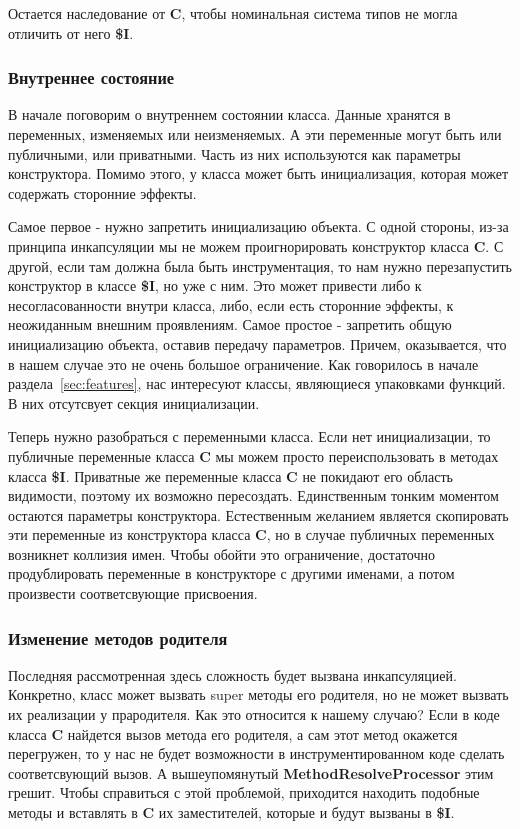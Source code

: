 Остается наследование от \textbf{C}, чтобы номинальная система типов не могла
отличить от него \textbf{\$I}.

\subsubsection{Внутреннее состояние}

В начале поговорим о внутреннем состоянии класса.
Данные хранятся в переменных, изменяемых или неизменяемых.
А эти переменные могут быть или публичными, или приватными.
Часть из них используются как параметры конструктора.
Помимо этого, у класса может быть инициализация, которая может содержать
сторонние эффекты.

Самое первое - нужно запретить инициализацию объекта.
С одной стороны, из-за принципа инкапсуляции мы не можем проигнорировать
конструктор класса \textbf{C}.
С другой, если там должна была быть инструментация, то нам нужно перезапустить
конструктор в классе \textbf{\$I}, но уже с ним.
Это может привести либо к несогласованности внутри класса, либо, если есть
сторонние эффекты, к неожиданным внешним проявлениям.
Самое простое - запретить общую инициализацию объекта, оставив передачу параметров.
Причем, оказывается, что в нашем случае это не очень большое ограничение.
Как говорилось в начале раздела~\ref{sec:features}, нас интересуют классы,
являющиеся упаковками функций.
В них отсутсвует секция инициализации.

Теперь нужно разобраться с переменными класса.
Если нет инициализации, то публичные переменные класса \textbf{C} мы можем
просто переиспользовать в методах класса \textbf{\$I}.
Приватные же переменные класса \textbf{C} не покидают его область
видимости, поэтому их возможно пересоздать.
Единственным тонким моментом остаются параметры конструктора.
Естественным желанием является скопировать эти переменные из конструктора
класса \textbf{C}, но в случае публичных переменных возникнет коллизия имен.
Чтобы обойти это ограничение, достаточно продублировать переменные в конструкторе
с другими именами, а потом произвести соответсвующие присвоения.

\subsubsection{Изменение методов родителя}

Последняя рассмотренная здесь сложность будет вызвана инкапсуляцией.
Конкретно, класс может вызвать super методы его родителя, но не может вызвать
их реализации у прародителя.
Как это относится к нашему случаю?
Если в коде класса \textbf{C} найдется вызов метода его родителя,
а сам этот метод окажется перегружен, то у нас не будет возможности в
инструментированном коде сделать соответсвующий вызов.
А вышеупомянутый \textbf{MethodResolveProcessor} этим грешит.
Чтобы справиться с этой проблемой, приходится находить подобные методы и
вставлять в \textbf{C} их заместителей, которые и будут вызваны в \textbf{\$I}.

